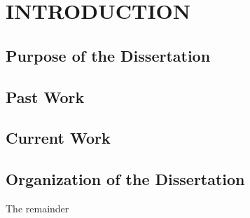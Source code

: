 %
%
%
\pagestyle{plain} %
\setcounter{page}{1}

\chapter{\uppercase {Introduction}}
\label{sec::Intro}


\section{Purpose of the Dissertation}
\label{sec::Intro_Purpose}


\section{Past Work}
\label{sec::Intro_Past}


\section{Current Work}
\label{sec::Intro_Current}

\section{Organization of the Dissertation}
\label{sec::Intro_Organization}

The remainder 